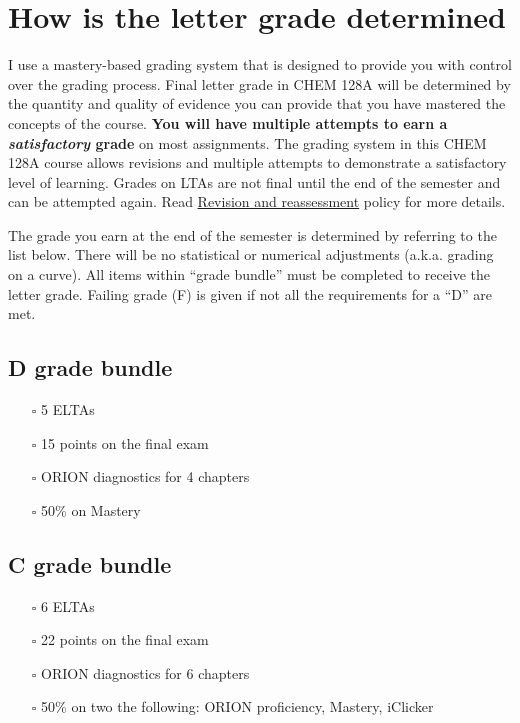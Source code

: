 \hypertarget{how-is-the-letter-grade-determined}{%
\section{How is the letter grade
determined}\label{how-is-the-letter-grade-determined}}

I use a mastery-based grading system that is designed to provide you
with control over the grading process. Final letter grade in CHEM 128A
will be determined by the quantity and quality of evidence you can
provide that you have mastered the concepts of the course. \textbf{You
will have multiple attempts to earn a \emph{satisfactory} grade} on most
assignments. The grading system in this CHEM 128A course allows
revisions and multiple attempts to demonstrate a satisfactory level of
learning. Grades on LTAs are not final until the end of the semester and
can be attempted again. Read \protect\hyperlink{revisions}{Revision and
reassessment} policy for more details.

The grade you earn at the end of the semester is determined by referring
to the list below. There will be no statistical or numerical adjustments
(a.k.a. grading on a curve). All items within ``grade bundle'' must be
completed to receive the letter grade. Failing grade (F) is given if not
all the requirements for a ``D'' are met.

\hypertarget{d-grade-bundle}{%
\subsection{D grade bundle}\label{d-grade-bundle}}

\begin{itemize}
\tightlist
\item[$\square$]
  5 ELTAs
\item[$\square$]
  15 points on the final exam
\item[$\square$]
  ORION diagnostics for 4 chapters
\item[$\square$]
  50\% on Mastery
\end{itemize}

\hypertarget{c-grade-bundle}{%
\subsection{C grade bundle}\label{c-grade-bundle}}

\begin{itemize}
\tightlist
\item[$\square$]
  6 ELTAs
\item[$\square$]
  22 points on the final exam
\item[$\square$]
  ORION diagnostics for 6 chapters
\item[$\square$]
  50\% on two the following: ORION proficiency, Mastery, iClicker
\end{itemize}

